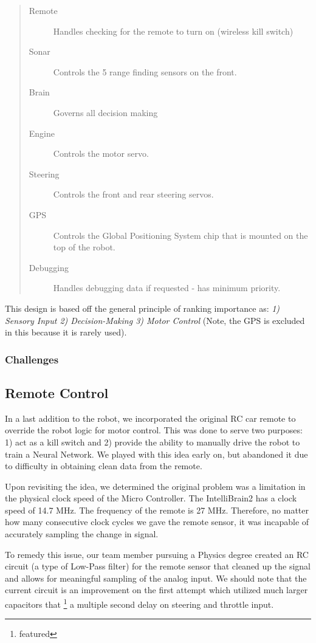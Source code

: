 \documentclass[12pt]{article}
\begin{document}
\begin{quote}
\begin{description}
\item[Remote] Handles checking for the remote to turn on (wireless kill switch)
\item[Sonar] Controls the 5 range finding sensors on the front.
\item[Brain] Governs all decision making
\item[Engine] Controls the motor servo.
\item[Steering] Controls the front and rear steering servos.
\item[GPS] Controls the Global Positioning System chip that is mounted on the top of the robot.
\item[Debugging] Handles debugging data if requested - has minimum priority.
\end{description}
\end{quote}

This design is based off the general principle of ranking importance as: \textit{1) Sensory Input 2) Decision-Making 3) Motor Control}  (Note, the GPS is excluded in this because it is rarely used).

\subsubsection{Challenges}

\clearpage
\subsection{Remote Control}
In a last addition to the robot, we incorporated the original RC car remote to override the robot logic for motor control.  This was done to serve two purposes: 1) act as a kill switch and 2) provide the ability to manually drive the robot to train a Neural Network.  We played with this idea early on, but abandoned it due to difficulty in obtaining clean data from the remote.

Upon revisiting the idea, we determined the original problem was a limitation in the physical clock speed of the Micro Controller.  The IntelliBrain2 has a clock speed of 14.7 MHz.  The frequency of the remote is 27 MHz.  Therefore, no matter how many consecutive clock cycles we gave the remote sensor, it was incapable of accurately sampling the change in signal.

To remedy this issue, our team member pursuing a Physics degree created an RC circuit (a type of Low-Pass filter) for the remote sensor that cleaned up the signal and allows for meaningful sampling of the analog input.  We should note that the current circuit is an improvement on the first attempt which utilized much larger capacitors that \footnote{featured} a multiple second delay on steering and throttle input.
\end{document}
